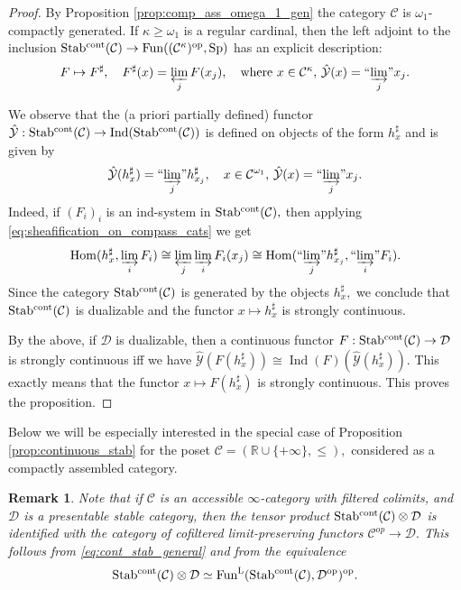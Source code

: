 \documentclass[11pt,leqno]{amsart}
\newtheorem{remark}[theo]{Remark}
\numberwithin{equation}{section}
\def\R{\mathbb{R}}
\def\Hom{\operatorname{Hom}}
\newcommand{\indlim}[1][]{\mathop{\varinjlim}\limits_{#1}}
\newcommand{\inddlim}[1][]{{``{\indlim[#1]}"}}
\newcommand{\prolim}[1][]{\mathop{\varprojlim}\limits_{#1}}
\newcommand{\Cone}{\operatorname{Cone}}
\newcommand{\cont}{\operatorname{cont}}
\newcommand{\cD}{{\mathcal D}}
\newcommand{\cC}{{\mathcal C}}
\newcommand{\cY}{{\mathcal Y}}
\newcommand{\Fun}{\operatorname{Fun}}
\newcommand{\Sp}{\operatorname{Sp}}
\newcommand{\Ind}{\operatorname{Ind}}
\newcommand{\Stab}{\rm Stab}
\begin{document}
\begin{proof} By Proposition \ref{prop:comp_ass_omega_1_gen} the category $\cC$ is $\omega_1$-compactly generated. If $\kappa\geq \omega_1$ is a regular cardinal, then the left adjoint to the inclusion $\Stab^{\cont}(\cC)\to\Fun((\cC^{\kappa})^{op},\Sp)$ has an explicit description:
\begin{equation}\label{eq:sheafification_on_compass_cats}F\mapsto F^{\sharp},\quad F^{\sharp}(x)=\prolim[j]F(x_j),\quad\text{where }x\in\cC^{\kappa},\,\hat{\cY}(x)=\inddlim[j]x_j.\end{equation}

We observe that the (a priori partially defined) functor $\hat{\cY}:\Stab^{\cont}(\cC)\to\Ind(\Stab^{\cont}(\cC))$ is defined on objects of the form $h_x^{\sharp}$ and is given by $$\hat{\cY}(h_x^{\sharp})=\inddlim[j]h_{x_j}^{\sharp},\quad x\in\cC^{\omega_1},\,\hat{\cY}(x)=\inddlim[j]x_j.$$  Indeed, if $(F_i)_i$ is an ind-system in $\Stab^{\cont}(\cC),$ then applying \eqref{eq:sheafification_on_compass_cats} we get
$$\Hom(h_x^{\sharp},\indlim[i]F_i)\cong\prolim[j]\indlim[i]F_i(x_j)\cong\Hom(\inddlim[j]h_{x_j}^{\sharp},\inddlim[i]F_i).$$
Since the category $\Stab^{\cont}(\cC)$ is generated by the objects $h_x^{\sharp},$ we conclude that $\Stab^{\cont}(\cC)$ is dualizable and the functor $x\mapsto h_x^{\sharp}$ is strongly continuous.


By the above, if $\cD$ is dualizable, then a continuous functor $F:\Stab^{\cont}(\cC)\to\cD$ is strongly continuous iff we have $\hat{\cY}(F(h_x^{\sharp}))\cong \Ind(F)(\hat{\cY}(h_x^{\sharp})).$ This exactly means that the functor $x\mapsto F(h_x^{\sharp})$ is strongly continuous. This proves the proposition.\end{proof}

Below we will be especially interested in the special case of Proposition \ref{prop:continuous_stab} for the poset $\cC=(\R\cup\{+\infty\},\leq),$ considered as a compactly assembled category.

\begin{remark}\label{rem:Stab_cont_otimes_something} Note that if $\cC$ is an accessible $\infty$-category with filtered colimits, and $\cD$ is a presentable stable category, then the tensor product $\Stab^{\cont}(\cC)\otimes\cD$ is identified with the category of cofiltered limit-preserving functors $\cC^{op}\to\cD.$ This follows from \eqref{eq:cont_stab_general} and from the equivalence
$$\Stab^{\cont}(\cC)\otimes\cD\simeq\Fun^L(\Stab^{\cont}(\cC),\cD^{op})^{op}.$$\end{remark}
\end{document}
